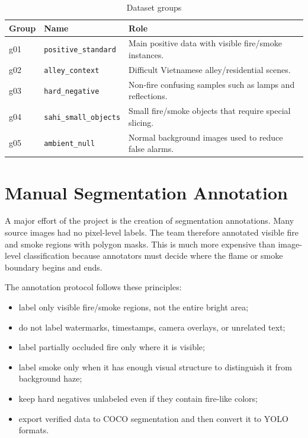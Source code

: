 \documentclass[12pt,a4paper]{report}
\newcommand{\code}[1]{\texttt{#1}}
\begin{document}
\begin{table}[H]
\centering
\caption{Dataset groups}
\label{tab:dataset-groups}
\begin{tabularx}{\textwidth}{p{}p{}Y}
\toprule
\textbf{Group} & \textbf{Name} & \textbf{Role} \\
\midrule
g01 & \code{positive\_standard} & Main positive data with visible fire/smoke instances. \\
g02 & \code{alley\_context} & Difficult Vietnamese alley/residential scenes. \\
g03 & \code{hard\_negative} & Non-fire confusing samples such as lamps and reflections. \\
g04 & \code{sahi\_small\_objects} & Small fire/smoke objects that require special slicing. \\
g05 & \code{ambient\_null} & Normal background images used to reduce false alarms. \\
\bottomrule
\end{tabularx}
\end{table}

\section{Manual Segmentation Annotation}
A major effort of the project is the creation of segmentation annotations. Many source images had no pixel-level labels. The team therefore annotated visible fire and smoke regions with polygon masks. This is much more expensive than image-level classification because annotators must decide where the flame or smoke boundary begins and ends.

The annotation protocol follows these principles:

\begin{itemize}
    \item label only visible fire/smoke regions, not the entire bright area;
    \item do not label watermarks, timestamps, camera overlays, or unrelated text;
    \item label partially occluded fire only where it is visible;
    \item label smoke only when it has enough visual structure to distinguish it from background haze;
    \item keep hard negatives unlabeled even if they contain fire-like colors;
    \item export verified data to COCO segmentation and then convert it to YOLO formats.
\end{itemize}
\end{document}
